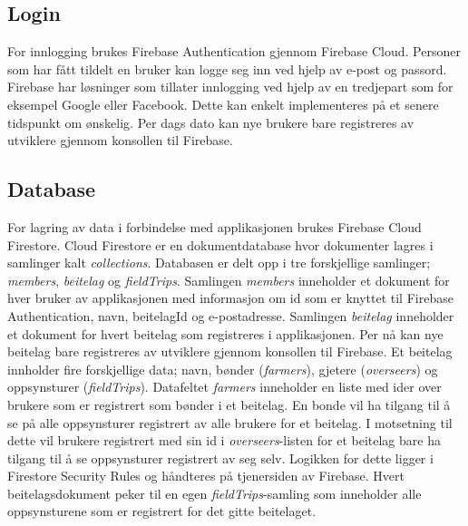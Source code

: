 \subsection{Login} \label{sub:backend-login}
For innlogging brukes Firebase Authentication gjennom Firebase Cloud. Personer som har fått tildelt en bruker kan logge seg inn ved hjelp av e-post og passord. Firebase har løsninger som tillater innlogging ved hjelp av en tredjepart som for eksempel Google eller Facebook. Dette kan enkelt implementeres på et senere tidspunkt om ønskelig. Per dags dato kan nye brukere bare registreres av utviklere gjennom konsollen til Firebase.

\subsection{Database}
For lagring av data i forbindelse med applikasjonen brukes Firebase Cloud Firestore. Cloud Firestore er en dokumentdatabase hvor dokumenter lagres i samlinger kalt \textit{collections}. Databasen er delt opp i tre forskjellige samlinger; \textit{members}, \textit{beitelag} og \textit{fieldTrips}. Samlingen \textit{members} inneholder et dokument for hver bruker av applikasjonen med informasjon om id som er knyttet til Firebase Authentication, navn, beitelagId og e-postadresse. Samlingen \textit{beitelag} inneholder et dokument for hvert beitelag som registreres i applikasjonen. Per nå kan nye beitelag bare registreres av utviklere gjennom konsollen til Firebase. Et beitelag innholder fire forskjellige data; navn, bønder (\textit{farmers}), gjetere (\textit{overseers}) og oppsynsturer (\textit{fieldTrips}). Datafeltet \textit{farmers} inneholder en liste med ider over brukere som er registrert som bønder i et beitelag. En bonde vil ha tilgang til å se på alle oppsynsturer registrert av alle brukere for et beitelag. I motsetning til dette vil brukere registrert med sin id i \textit{overseers}-listen for et beitelag bare ha tilgang til å se oppsynsturer registrert av seg selv. Logikken for dette ligger i Firestore Security Rules og håndteres på tjenersiden av Firebase. Hvert beitelagsdokument peker til en egen \textit{fieldTrips}-samling som inneholder alle oppsynsturene som er registrert for det gitte beitelaget.

